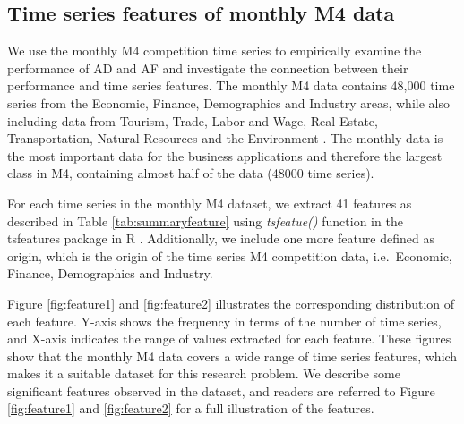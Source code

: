 \documentclass[preprint, 3p,
authoryear]{elsarticle} %
\begin{document}
\hypertarget{mtsmeasure}{%
\subsection{Time series features of monthly M4 data}\label{mtsmeasure}}

We use the monthly M4 competition time series to empirically examine the
performance of AD and AF and investigate the connection between their
performance and time series features. The monthly M4 data contains
48,000 time series from the Economic, Finance, Demographics and Industry
areas, while also including data from Tourism, Trade, Labor and Wage,
Real Estate, Transportation, Natural Resources and the Environment
\citep{Makridakis2018}. The monthly data is the most important data for
the business applications \citep{Spiliotis2020} and therefore the
largest class in M4, containing almost half of the data (48000 time
series).

For each time series in the monthly M4 dataset, we extract 41 features
as described in Table \ref{tab:summaryfeature} using \emph{tsfeatue()}
function in the tsfeatures package in R \citep{tsfeatures2020}.
Additionally, we include one more feature defined as origin, which is
the origin of the time series M4 competition data, i.e.~Economic,
Finance, Demographics and Industry.

Figure \ref{fig:feature1} and \ref{fig:feature2} illustrates the
corresponding distribution of each feature. Y-axis shows the frequency
in terms of the number of time series, and X-axis indicates the range of
values extracted for each feature. These figures show that the monthly
M4 data covers a wide range of time series features, which makes it a
suitable dataset for this research problem. We describe some significant
features observed in the dataset, and readers are referred to Figure
\ref{fig:feature1} and \ref{fig:feature2} for a full illustration of the
features.
\end{document}
